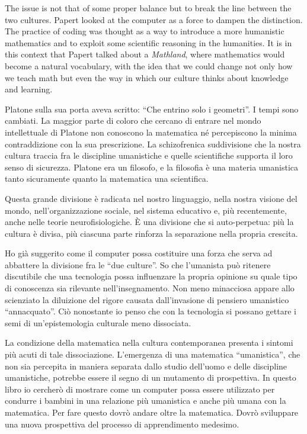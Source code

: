 The issue is not that of some proper balance but to break the line between the two cultures. Papert looked at the computer as a force to dampen the distinction. The practice of coding was thought as a way to introduce a more humanistic mathematics and to exploit some scientific reasoning in the humanities. It is in this context that Papert talked about a \textit{Mathland}, where mathematics would become a natural vocabulary, with the idea that we could change not only how we teach math but even the way in which our culture thinks about knowledge and learning.


Platone sulla sua porta aveva scritto: “Che entrino solo i geometri”. I tempi sono cambiati. La maggior parte di coloro che cercano di entrare nel mondo intellettuale di Platone non conoscono la matematica né percepiscono la minima contraddizione con la sua prescrizione. La schizofrenica suddivisione che la nostra cultura traccia fra le discipline umanistiche e quelle scientifiche supporta il loro senso di sicurezza. Platone era un filosofo, e la filosofia è una materia umanistica tanto sicuramente quanto la matematica una scientifica.

Questa grande divisione è radicata nel nostro linguaggio, nella nostra visione del mondo, nell'organizzazione sociale, nel sistema educativo e, più recentemente, anche nelle teorie neurofisiologiche. È una divisione che si auto-perpetua: più la cultura è divisa, più ciascuna parte rinforza la separazione nella propria crescita.

Ho già suggerito come il computer possa costituire una forza che serva ad abbattere la divisione fra le “due culture”. So che l'umanista può ritenere discutibile che una tecnologia possa influenzare la propria opinione su quale tipo di conoscenza sia rilevante nell'insegnamento. Non meno minacciosa appare allo scienziato la diluizione del rigore causata dall'invasione di pensiero umanistico “annacquato”. Ciò nonostante io penso che con la tecnologia si possano gettare i semi di un'epistemologia culturale meno dissociata. 

La condizione della matematica nella cultura contemporanea presenta i sintomi più acuti di tale dissociazione. L'emergenza di una matematica “umanistica”, che non sia percepita in maniera separata dallo studio dell'uomo e delle discipline umanistiche, potrebbe essere il segno di un mutamento di prospettiva. In questo libro io cercherò di mostrare come un computer possa essere utilizzato per condurre i bambini in una relazione più umanistica e anche più umana con la matematica. Per fare questo dovrò andare oltre la matematica. Dovrò sviluppare una nuova prospettiva del processo di apprendimento medesimo. 

